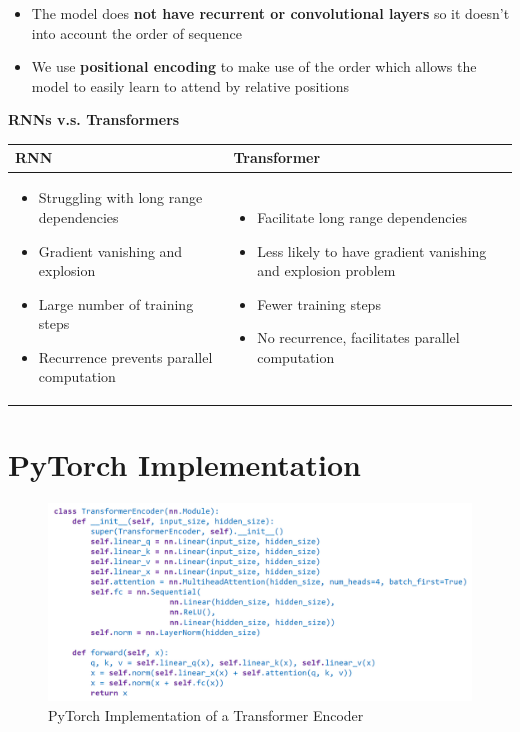 \begin{itemize}
    \item The model does \textbf{not have recurrent or convolutional layers} so it doesn’t into account the order of sequence
    \item We use\textbf{ positional encoding} to make use of the order which allows the model to
easily learn to attend by relative positions
\end{itemize}

\newpage
\noindent
\textbf{RNNs v.s. Transformers}\\

\begin{tabular}{|p{8cm}|p{8cm}|}
\hline
\textbf{RNN} & \textbf{Transformer} \\
\hline
\begin{itemize}
    \item Struggling with long range dependencies
    \item Gradient vanishing and explosion
    \item Large number of training steps
    \item Recurrence prevents parallel computation
\end{itemize} &
\begin{itemize}
    \item Facilitate long range dependencies
    \item Less likely to have gradient vanishing and explosion problem
    \item Fewer training steps
    \item No recurrence, facilitates parallel computation
\end{itemize} \\
\hline
\end{tabular}

\section{PyTorch Implementation}

\begin{figure}[h!t]
    \centering
    \includegraphics[width=0.75\linewidth]{transformerencoder.png}
    \caption{PyTorch Implementation of a Transformer Encoder}
    \label{fig:enter-label}
\end{figure}

